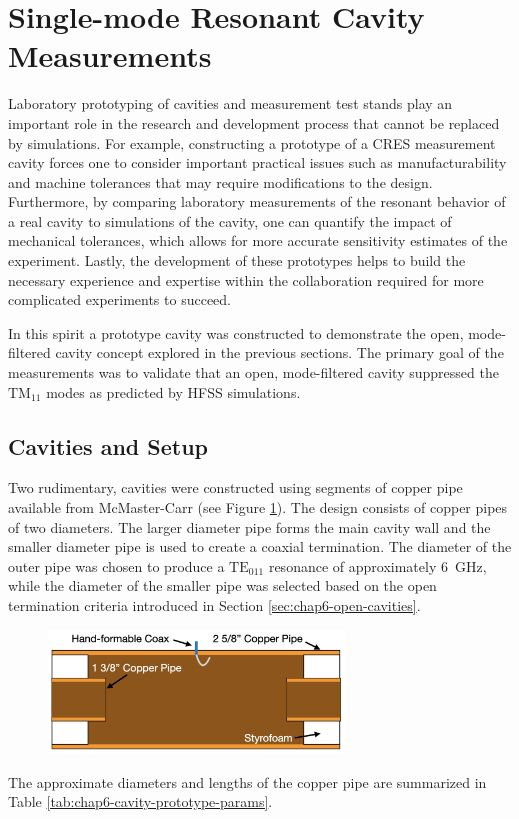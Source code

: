 \section{Single-mode Resonant Cavity Measurements}
\label{sec:chap6-single-mode-cavity-measurement}

Laboratory prototyping of cavities and measurement test stands play an important role in the research and development process that cannot be replaced by simulations. For example, constructing a prototype of a CRES measurement cavity forces one to consider important practical issues such as manufacturability and machine tolerances that may require modifications to the design. Furthermore, by comparing laboratory measurements of the resonant behavior of a real cavity to simulations of the cavity, one can quantify the impact of mechanical tolerances, which allows for more accurate sensitivity estimates of the experiment. Lastly, the development of these prototypes helps to build the necessary experience and expertise within the collaboration required for more complicated experiments to succeed.

In this spirit a prototype cavity was constructed to demonstrate the open, mode-filtered cavity concept explored in the previous sections. The primary goal of the measurements was to validate that an open, mode-filtered cavity suppressed the $\mathrm{TM}_{11}$ modes as predicted by HFSS simulations.

\subsection{Cavities and Setup}

Two rudimentary, cavities were constructed using segments of copper pipe available from McMaster-Carr (see Figure \ref{fig:toy-cavity-cartoon}). The design consists of copper pipes of two diameters. The larger diameter pipe forms the main cavity wall and the smaller diameter pipe is used to create a coaxial termination. The diameter of the outer pipe was chosen to produce a $\mathrm{TE}_{011}$ resonance of approximately 6~GHz, while the diameter of the smaller pipe was selected based on the open termination criteria introduced in Section \ref{sec:chap6-open-cavities}.
\begin{figure}[htbp]
    \centering
    \includegraphics*[width=0.7\textwidth]{figs/Chapter-6/230612_toy_cavity_cartoon.png}
    \caption{\label{fig:toy-cavity-cartoon} }
\end{figure}
The approximate diameters and lengths of the copper pipe are summarized in Table \ref{tab:chap6-cavity-prototype-params}. 

